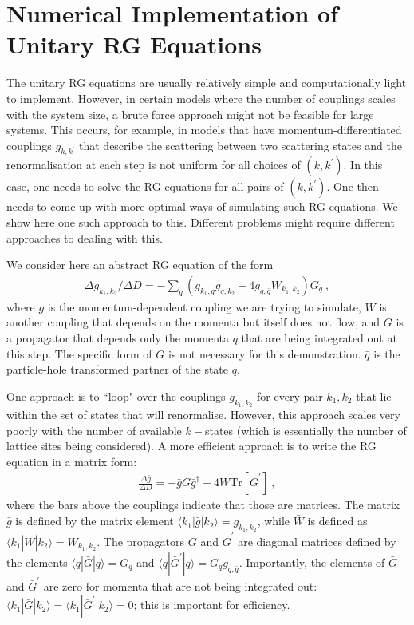 \section{Numerical Implementation of Unitary RG Equations}
The unitary RG equations are usually relatively simple and computationally light to implement. However, in certain models where the number of couplings scales with the system size, a brute force approach might not be feasible for large systems. This occurs, for example, in models that have momentum-differentiated couplings \(g_{k,k^\prime}\) that describe the scattering between two scattering states and the renormalisation at each step is not uniform for all choices of \((k,k^\prime)\). In this case, one needs to solve the RG equations for all pairs of \((k,k^\prime)\). One then needs to come up with more optimal ways of simulating such RG equations. We show here one such approach to this. Different problems might require different approaches to dealing with this.

We consider here an abstract RG equation of the form
\begin{equation}\begin{aligned}
	\Delta g_{k_1,k_2}/\Delta D = -\sum_q \left(g_{k_1,q}g_{q,k_2} - 4 g_{q,\bar q}W_{k_1, k_2}\right)G_q~,
\end{aligned}\end{equation}
where \(g\) is the momentum-dependent coupling we are trying to simulate, \(W\) is another coupling that depends on the momenta but itself does not flow, and \(G\) is a propagator that depends only the momenta \(q\) that are being integrated out at this step. The specific form of \(G\) is not necessary for this demonstration. \(\bar q\) is the particle-hole transformed partner of the state \(q\). 

One approach is to ``loop" over the couplings \(g_{k_1,k_2}\) for every pair \(k_1, k_2\) that lie within the set of states that will renormalise. However, this approach scales very poorly with the number of available \(k-\)states (which is essentially the number of lattice sites being considered). A more efficient approach is to write the RG equation in a matrix form:
\begin{equation}\begin{aligned}\label{matrixEq}
	\frac{\Delta \bar g}{\Delta D} = -\bar g \bar G \bar g^\dagger - 4\bar W\text{Tr}\left[\bar G^\prime\right]~,
\end{aligned}\end{equation}
where the bars above the couplings indicate that those are matrices. The matrix \(\bar g\) is defined by the matrix element \(\langle k_1 | \bar g | k_2 \rangle = g_{k_1,k_2}\), while \(\bar W\) is defined as \(\langle k_1 | \bar W | k_2 \rangle = W_{k_1,k_2}\). The propagators \(\bar G\) and \(\bar G^\prime\) are diagonal matrices defined by the elements \(\langle q | \bar G | q \rangle = G_q\) and \(\langle q | \bar G^\prime | q \rangle = G_q g_{q,\bar q}\). Importantly, the elements of \(\bar G\) and \(\bar G^\prime\) are zero for momenta that are not being integrated out: \(\langle k_1 | \bar G | k_2 \rangle = \langle k_1 | \bar G^\prime | k_2 \rangle = 0\); this is important for efficiency.

